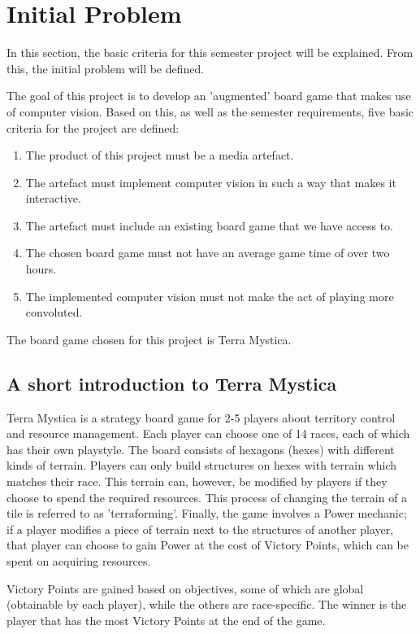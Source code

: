 \chapter{Initial Problem}\label{ch:iniprob}
In this section, the basic criteria for this semester project will be explained. From this, the initial problem will be defined.

The goal of this project is to develop an 'augmented' board game that makes use of computer vision. Based on this, as well as the semester requirements, five basic criteria for the project are defined:

\begin{enumerate}
	\item The product of this project must be a media artefact.
	\item The artefact must implement computer vision in such a way that makes it interactive.
	\item The artefact must include an existing board game that we have access to.
	 \item The chosen board game must not have an average game time of over two hours.
	\item The implemented computer vision must not make the act of playing more convoluted.
\end{enumerate}

The board game chosen for this project is Terra Mystica.

\section{A short introduction to Terra Mystica}
Terra Mystica is a strategy board game for 2-5 players about territory control and resource management. Each player can choose one of 14 races, each of which has their own playstyle. The board consists of hexagons (hexes) with different kinds of terrain. Players can only build structures on hexes with terrain which matches their race. This terrain can, however, be modified by players if they choose to spend the required resources. This process of changing the terrain of a tile is referred to as 'terraforming'. Finally, the game involves a Power mechanic; if a player modifies a piece of terrain next to the structures of another player, that player can choose to gain Power at the cost of Victory Points, which can be spent on acquiring resources.  

Victory Points are gained based on objectives, some of which are global (obtainable by each player), while the others are race-specific. The winner is the player that has the most Victory Points at the end of the game.

